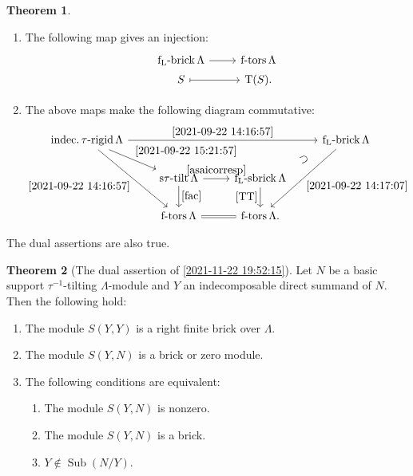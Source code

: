 \documentclass[pdftex,a4paper]{article}
\numberwithin{equation}{subsection}
\theoremstyle{definition}
\newtheorem{theorem}{Theorem}[section]
\newcommand{\stautilt}{\operatorname{\mathrm{s\tau-tilt}}}
\newcommand{\itaurigid}{\operatorname{\mathrm{indec.\tau-rigid}}}
\newcommand{\ftors}{\operatorname{\mathrm{f-tors}}}
\newcommand{\Sub}{\operatorname{\mathrm{Sub}}}
\newcommand{\flsbrick}{\operatorname{\mathrm{f_L-sbrick}}}
\newcommand{\flbrick}{\operatorname{\mathrm{f_L-brick}}}
\newcommand{\torscl}{\operatorname{\mathrm{T}}}
\begin{document}
\begin{theorem}
\begin{enumerate}
		\item The following map gives an injection:
		      \begin{equation}\label{2021-09-22 14:17:07}
			      \begin{tikzcd}[row sep=1pt]
				      \flbrick \Lambda \ar[r] &\ftors \Lambda\\
				      S \ar[r,mapsto]& \torscl (S).
			      \end{tikzcd}
		      \end{equation}
		\item The above maps make the following diagram commutative:
		      \begin{equation}
			      \begin{tikzcd}
				      \itaurigid \Lambda \ar[rrr,"\eqref{2021-09-22 14:16:57}"]\ar[dr,"\eqref{2021-09-22 15:21:57}"]\ar[ddr,"\eqref{2021-09-22 14:16:57}"']& & &\flbrick \Lambda \ar[dl,phantom,"\supset"sloped] \ar[ddl,"\eqref{2021-09-22 14:17:07}"]\\
				      &\stautilt \Lambda \ar[d,"\eqref{fac}"] \ar[r,"\eqref{asaicorresp}"]& \flsbrick \Lambda \ar[d,"\eqref{TT}"']&
				      \\
				      &\ftors \Lambda \ar[r,equal]& \ftors \Lambda.&
			      \end{tikzcd}
		      \end{equation}
	\end{enumerate}
\end{theorem}

The dual assertions are also true.

\begin{theorem}
	[{The dual assertion of \cref{2021-11-22 19:52:15}}]\label{labeling method taui 2021-10-13 17:35:43}
	Let \(N\) be a basic support \(\tau^{-1}\)-tilting \(\Lambda\)-module and \(Y\) an indecomposable direct summand of \(N\).
	Then the following hold:
	\begin{enumerate}
		\item The module \(S(Y,Y)\) is a right finite brick over \(\Lambda\).
		\item The module \(S(Y,N)\) is a brick or zero module.
		\item The following conditions are equivalent:
		      \begin{enumerate}
			      \item The module \(S(Y,N)\) is nonzero.
			      \item The module \(S(Y,N)\) is a brick.
			      \item \(Y\notin \Sub(N/Y)\).
		      \end{enumerate}
	\end{enumerate}
\end{theorem}
\end{document}
